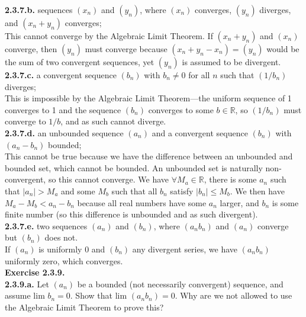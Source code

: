 \documentclass[12pt,letterpaper]{article}
\begin{document}
\textbf{2.3.7.b.} sequences \((x_{n})\) and \((y_{n})\), where \((x_{n})\) converges, \((y_{n})\) diverges, and \((x_{n} + y_{n})\) converges; \\

This cannot converge by the Algebraic Limit Theorem. If \((x_{n} + y_{n})\) and \((x_{n})\) converge, then \((y_{n})\) must converge because \((x_{n} + y_{n} - x_{n}) = (y_{n})\) would be the sum of two convergent sequences, yet \((y_{n})\) is assumed to be divergent. \\ 

\textbf{2.3.7.c.} a convergent sequence \((b_{n})\) with \(b_{n} \neq 0\) for all \(n\) such that \((1/b_{n})\) diverges; \\

This is impossible by the Algebraic Limit Theorem---the uniform sequence of 1 converges to 1 and the sequence \((b_{n})\) converges to some \(b \in \mathbb{R}\), so \((1/b_{n})\) must converge to \(1/b\), and as such cannot diverge. \\

\textbf{2.3.7.d.} an unbounded sequence \((a_{n})\) and a convergent sequence \((b_{n})\) with \((a_{n} - b_{n})\) bounded; \\

This cannot be true because we have the difference between an unbounded and bounded set, which cannot be bounded. An unbounded set is naturally non-convergent, so this cannot converge. We have \(\forall M_{a} \in \mathbb{R}\), there is some \(a_{n}\) such that \(|a_{n}| > M_{a}\) and some \(M_{b}\) such that all \(b_{n}\) satisfy \(|b_{n}| \leq M_{b}\). We then have \(M_{a} - M_{b} < a_{n} - b_{n}\) because all real numbers have some \(a_{n}\) larger, and \(b_{n}\) is some finite number (so this difference is unbounded and as such divergent). \\

\textbf{2.3.7.e.} two sequences \((a_{n})\) and \((b_{n})\), where \((a_{n}b_{n})\) and \((a_{n})\) converge but \((b_{n})\) does not. \\

If \((a_{n})\) is uniformly \(0\) and \((b_{n})\) any divergent series, we have \((a_{n}b_{n})\) uniformly zero, which converges. \\

\textbf{Exercise 2.3.9.} \\

\textbf{2.3.9.a.} Let \((a_{n})\) be a bounded (not necessarily convergent) sequence, and assume \(\text{lim } b_{n} = 0\). Show that \(\text{lim }(a_{n}b_{n}) = 0.\) Why are we not allowed to use the Algebraic Limit Theorem to prove this? \\
\end{document}
